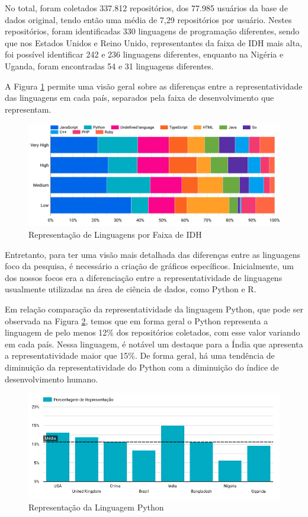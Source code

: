 \documentclass[12pt]{article}
\begin{document}
No total, foram coletados 337.812 repositórios, dos 77.985 usuários da base de dados original, tendo então uma média de 7,29 repositórios por usuário. Nestes repositórios, foram identificadas 330 linguagens de programação diferentes, sendo que nos Estados Unidos e Reino Unido, representantes da faixa de IDH mais alta, foi possível identificar 242 e 236 linguagens diferentes, enquanto na Nigéria e Uganda, foram encontradas 54 e 31 linguagens diferentes.

A Figura \ref{fig:graphlanguages} permite uma visão geral sobre as diferenças entre a representatividade das linguagens em cada país, separados pela faixa de desenvolvimento que representam.

\begin{figure}[ht]
\centering
\includegraphics[width=1\textwidth]{img/rq1/graph_languages.png}
\caption{Representação de Linguagens por Faixa de IDH}
\label{fig:graphlanguages}
\end{figure}

Entretanto, para ter uma visão mais detalhada das diferenças entre as linguagens foco da pesquisa, é necessário a criação de gráficos específicos. Inicialmente, um dos nossos focos era a diferenciação entre a representatividade de linguagens usualmente utilizadas na área de ciência de dados, como Python e R. 

Em relação comparação da representatividade da linguagem Python, que pode ser observada na Figura \ref{fig:python}, temos que em forma geral o Python representa a linguagem de pelo menos 12\% dos repositórios coletados, com esse valor variando em cada país. Nessa linguagem, é notável um destaque para a Índia que apresenta a representatividade maior que 15\%. De forma geral, há uma tendência de diminuição da representatividade do Python com a diminuição do índice de desenvolvimento humano.

\begin{figure}[H]
\centering
\includegraphics[width=1\textwidth]{img/rq1/python.png}
\caption{Representação da Linguagem Python}
\label{fig:python}
\end{figure}
\end{document}

